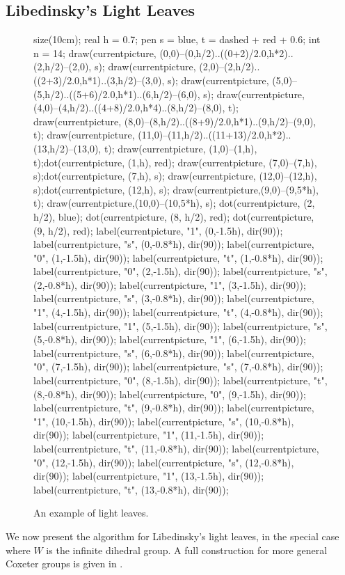 \subsection{Libedinsky's Light Leaves}
\label{sec:prelim_lightleave}
\begin{figure}[ht]
	\centering
	\begin{asy}
	size(10cm);
	real h = 0.7;
	pen s = blue, t = dashed + red + 0.6;
	int n = 14;
	draw(currentpicture, (0,0)--(0,h/2)..((0+2)/2.0,h*2)..(2,h/2)--(2,0), s);
	draw(currentpicture, (2,0)--(2,h/2)..((2+3)/2.0,h*1)..(3,h/2)--(3,0), s);
	draw(currentpicture, (5,0)--(5,h/2)..((5+6)/2.0,h*1)..(6,h/2)--(6,0), s);
	draw(currentpicture, (4,0)--(4,h/2)..((4+8)/2.0,h*4)..(8,h/2)--(8,0), t);
	draw(currentpicture, (8,0)--(8,h/2)..((8+9)/2.0,h*1)..(9,h/2)--(9,0), t);
	draw(currentpicture, (11,0)--(11,h/2)..((11+13)/2.0,h*2)..(13,h/2)--(13,0), t);
	draw(currentpicture, (1,0)--(1,h), t);dot(currentpicture, (1,h), red);
	draw(currentpicture, (7,0)--(7,h), s);dot(currentpicture, (7,h), s);
	draw(currentpicture, (12,0)--(12,h), s);dot(currentpicture, (12,h), s);
	draw(currentpicture,(9,0)--(9,5*h), t);
	draw(currentpicture,(10,0)--(10,5*h), s);
	dot(currentpicture, (2, h/2), blue);
	dot(currentpicture, (8, h/2), red);
	dot(currentpicture, (9, h/2), red);
	label(currentpicture, "1", (0,-1.5h), dir(90));
	label(currentpicture, "s", (0,-0.8*h), dir(90));
	label(currentpicture, "0", (1,-1.5h), dir(90));
	label(currentpicture, "t", (1,-0.8*h), dir(90));
	label(currentpicture, "0", (2,-1.5h), dir(90));
	label(currentpicture, "s", (2,-0.8*h), dir(90));
	label(currentpicture, "1", (3,-1.5h), dir(90));
	label(currentpicture, "s", (3,-0.8*h), dir(90));
	label(currentpicture, "1", (4,-1.5h), dir(90));
	label(currentpicture, "t", (4,-0.8*h), dir(90));
	label(currentpicture, "1", (5,-1.5h), dir(90));
	label(currentpicture, "s", (5,-0.8*h), dir(90));
	label(currentpicture, "1", (6,-1.5h), dir(90));
	label(currentpicture, "s", (6,-0.8*h), dir(90));
	label(currentpicture, "0", (7,-1.5h), dir(90));
	label(currentpicture, "s", (7,-0.8*h), dir(90));
	label(currentpicture, "0", (8,-1.5h), dir(90));
	label(currentpicture, "t", (8,-0.8*h), dir(90));
	label(currentpicture, "0", (9,-1.5h), dir(90));
	label(currentpicture, "t", (9,-0.8*h), dir(90));
	label(currentpicture, "1", (10,-1.5h), dir(90));
	label(currentpicture, "s", (10,-0.8*h), dir(90));
	label(currentpicture, "1", (11,-1.5h), dir(90));
	label(currentpicture, "t", (11,-0.8*h), dir(90));
	label(currentpicture, "0", (12,-1.5h), dir(90));
	label(currentpicture, "s", (12,-0.8*h), dir(90));
	label(currentpicture, "1", (13,-1.5h), dir(90));
	label(currentpicture, "t", (13,-0.8*h), dir(90));
	\end{asy}
	\caption{An example of light leaves.}
	\label{fig:lightleaf_example}
\end{figure}
We now present the algorithm for Libedinsky's light leaves, in the special case where $W$ is the infinite dihedral group.  A full construction for more general Coxeter groups is given in \cite{gr4all}.

